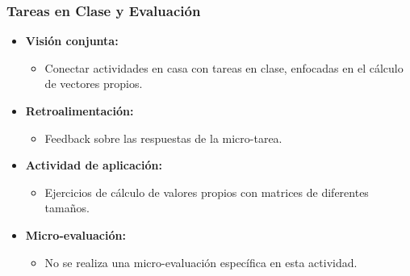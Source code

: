 \begin{frame}
    \frametitle{Tareas en Clase y Evaluación}
    \begin{itemize}[leftmargin=*]
        \item \textbf{Visión conjunta:}
        \begin{itemize}
            \item Conectar actividades en casa con tareas en clase, enfocadas en el cálculo de vectores propios.
        \end{itemize}
        \item \textbf{Retroalimentación:}
        \begin{itemize}
            \item Feedback sobre las respuestas de la micro-tarea.
        \end{itemize}
        \item \textbf{Actividad de aplicación:}
        \begin{itemize}
            \item Ejercicios de cálculo de valores propios con matrices de diferentes tamaños.
        \end{itemize}
        \item \textbf{Micro-evaluación:}
        \begin{itemize}
            \item No se realiza una micro-evaluación específica en esta actividad.
        \end{itemize}
    \end{itemize}
\end{frame}
